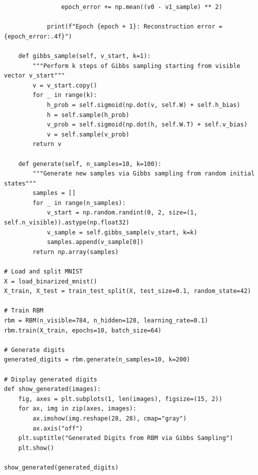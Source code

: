 \documentclass[%
oneside,                 %
final,                   %
10pt]{article}
\begin{document}
\begin{verbatim}
                epoch_error += np.mean((v0 - v1_sample) ** 2)

            print(f"Epoch {epoch + 1}: Reconstruction error = {epoch_error:.4f}")

    def gibbs_sample(self, v_start, k=1):
        """Perform k steps of Gibbs sampling starting from visible vector v_start"""
        v = v_start.copy()
        for _ in range(k):
            h_prob = self.sigmoid(np.dot(v, self.W) + self.h_bias)
            h = self.sample(h_prob)
            v_prob = self.sigmoid(np.dot(h, self.W.T) + self.v_bias)
            v = self.sample(v_prob)
        return v

    def generate(self, n_samples=10, k=100):
        """Generate new samples via Gibbs sampling from random initial states"""
        samples = []
        for _ in range(n_samples):
            v_start = np.random.randint(0, 2, size=(1, self.n_visible)).astype(np.float32)
            v_sample = self.gibbs_sample(v_start, k=k)
            samples.append(v_sample[0])
        return np.array(samples)

# Load and split MNIST
X = load_binarized_mnist()
X_train, X_test = train_test_split(X, test_size=0.1, random_state=42)

# Train RBM
rbm = RBM(n_visible=784, n_hidden=128, learning_rate=0.1)
rbm.train(X_train, epochs=10, batch_size=64)

# Generate digits
generated_digits = rbm.generate(n_samples=10, k=200)

# Display generated digits
def show_generated(images):
    fig, axes = plt.subplots(1, len(images), figsize=(15, 2))
    for ax, img in zip(axes, images):
        ax.imshow(img.reshape(28, 28), cmap="gray")
        ax.axis("off")
    plt.suptitle("Generated Digits from RBM via Gibbs Sampling")
    plt.show()

show_generated(generated_digits)

\end{verbatim}


\end{document}

